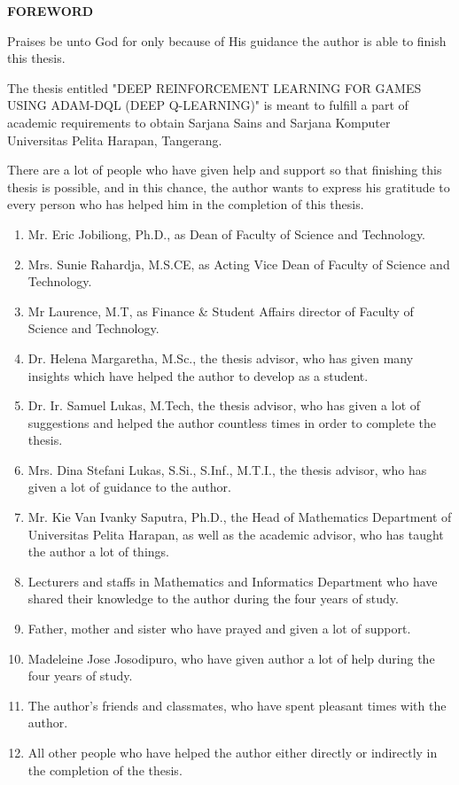 \pagestyle{fancy}
\begin{spacing}{1.25}
\begin{center}
\large\textbf{FOREWORD}\\ 
\end{center}
\vspace{0.5cm}
    \par
	Praises be unto God for only because of His guidance the author is able to finish this thesis.
    \par
	The thesis entitled "DEEP REINFORCEMENT LEARNING FOR GAMES USING ADAM-DQL (DEEP Q-LEARNING)" is meant to fulfill a part of academic requirements to obtain Sarjana Sains and Sarjana Komputer Universitas Pelita Harapan, Tangerang.
    \par
	There are a lot of people who have given help and support so that finishing this thesis is possible, and in this chance, the author wants to express his gratitude to every person who has helped him in the completion of this thesis.

	\begin{enumerate}[topsep=0pt,itemsep=-1ex,partopsep=1ex,parsep=1ex]
		\item Mr. Eric Jobiliong, Ph.D., as Dean of Faculty of Science and Technology.
		\item Mrs. Sunie Rahardja, M.S.CE, as Acting Vice Dean of Faculty of Science and Technology.
		\item Mr Laurence, M.T, as Finance \& Student Affairs director of Faculty of Science and Technology.
		\item Dr. Helena Margaretha, M.Sc., the thesis advisor, who has given many insights which have helped the author to develop as a student.
		\item Dr. Ir. Samuel Lukas, M.Tech, the thesis advisor, who has given a lot of suggestions and helped the author countless times in order to complete the thesis.
		\item Mrs. Dina Stefani Lukas, S.Si., S.Inf., M.T.I., the thesis advisor, who has given a lot of guidance to the author.
		\item Mr. Kie Van Ivanky Saputra, Ph.D., the Head of Mathematics Department of Universitas Pelita Harapan, as well as the academic advisor, who has taught the author a lot of things.
		\item Lecturers and staffs in Mathematics and Informatics Department who have shared their knowledge to the author during the four years of study.
		\item Father, mother and sister who have prayed and given a lot of support.
		\item Madeleine Jose Josodipuro, who have given author a lot of help during the four years of study.
		\item The author's friends and classmates, who have spent pleasant times with the author.
		\item All other people who have helped the author either directly or indirectly in the completion of the thesis.
	\end{enumerate}


\end{spacing}
